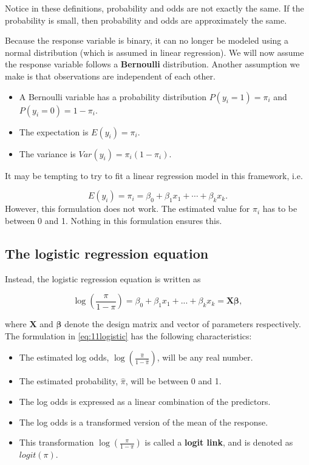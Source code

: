 \documentclass[
]{book}
\providecommand{\tightlist}{%
  \setlength{\itemsep}{0pt}\setlength{\parskip}{0pt}}
\begin{document}
Notice in these definitions, probability and odds are not exactly the same. If the probability is small, then probability and odds are approximately the same.

Because the response variable is binary, it can no longer be modeled using a normal distribution (which is assumed in linear regression). We will now assume the response variable follows a \textbf{Bernoulli} distribution. Another assumption we make is that observations are independent of each other.

\begin{itemize}
\tightlist
\item
  A Bernoulli variable has a probability distribution \(P(y_i = 1) = \pi_i\) and \(P(y_i = 0) = 1-\pi_i\).
\item
  The expectation is \(E(y_i) = \pi_i\).
\item
  The variance is \(Var(y_i) = \pi_i (1-\pi_i)\).
\end{itemize}

It may be tempting to try to fit a linear regression model in this framework, i.e.

\[
E(y_i) = \pi_i = \beta_0 + \beta_1 x_1 + \cdots + \beta_k x_k.
\]
However, this formulation does not work. The estimated value for \(\hat{\pi_i}\) has to be between 0 and 1. Nothing in this formulation ensures this.

\hypertarget{the-logistic-regression-equation}{%
\subsection{The logistic regression equation}\label{the-logistic-regression-equation}}

Instead, the logistic regression equation is written as

\begin{equation} 
\log(\frac{\pi}{1-\pi})=\beta_0+\beta_1x_1+...+\beta_{k} x_{k} = \boldsymbol{X \beta},
\label{eq:11logistic}
\end{equation}

where \(\boldsymbol{X}\) and \(\boldsymbol{\beta}\) denote the design matrix and vector of parameters respectively. The formulation in \eqref{eq:11logistic} has the following characteristics:

\begin{itemize}
\tightlist
\item
  The estimated log odds, \(\log \left( \frac{\hat{\pi}}{1-\hat{\pi}} \right)\), will be any real number.
\item
  The estimated probability, \(\hat{\pi}\), will be between 0 and 1.
\item
  The log odds is expressed as a linear combination of the predictors.
\item
  The log odds is a transformed version of the mean of the response.\\
\item
  This transformation \(\log \left( \frac{\pi}{1-\pi} \right)\) is called a \textbf{logit link}, and is denoted as \(logit(\pi)\).
\end{itemize}
\end{document}
